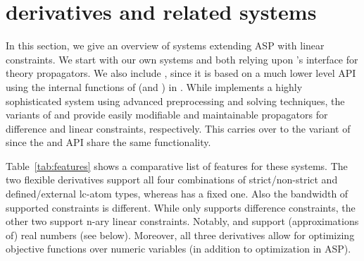 
\section{\clingo{} derivatives and related systems}\label{sec:system}

In this section, we give an overview of systems extending ASP with linear constraints.
We start with our own systems  and 
both relying upon \clingo's interface for theory propagators.
We also include \clingcon, since it is based on a much lower level API
using the internal functions of \clingo{} (and \clasp) in \cpp.
While \clingcon{} implements a highly sophisticated system using advanced preprocessing and solving techniques,
the \python{} variants of  and  provide easily modifiable and maintainable propagators for difference and linear constraints,
respectively.
This carries over to the \cpp{} variant of  since the \cpp{} and \python{} API share the same functionality. 

Table~\ref{tab:features} shows a comparative list of features for these systems.
The two flexible \clingo{} derivatives support all four combinations
of strict/non-strict and defined/external lc-atom types,
whereas \clingcon{} has a fixed one.
Also the bandwidth of supported constraints is different.
While  only supports difference constraints,
the other two support n-ary linear constraints.
Notably,  and  support (approximations of) real numbers (see below).
Moreover, all three \clingo{} derivatives allow for optimizing objective functions over
numeric variables (in addition to optimization in ASP).

